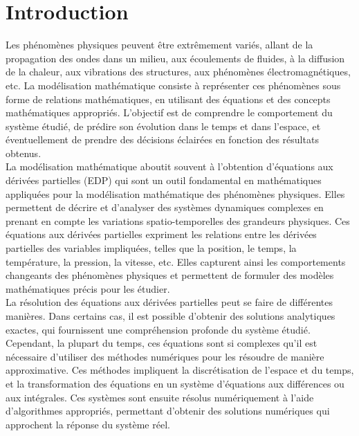 \chapter{Introduction}
\label{chap:introduction}

Les phénomènes physiques peuvent être extrêmement variés, allant de la propagation des ondes dans un milieu, aux écoulements de fluides, à la diffusion de la chaleur, aux vibrations des structures, aux phénomènes électromagnétiques, etc. La modélisation mathématique consiste à représenter ces phénomènes sous forme de relations mathématiques, en utilisant des équations et des concepts mathématiques appropriés. L'objectif est de comprendre le comportement du système étudié, de prédire son évolution dans le temps et dans l'espace, et éventuellement de prendre des décisions éclairées en fonction des résultats obtenus.\\

La modélisation mathématique aboutit souvent à l'obtention d'équations aux dérivées partielles (EDP) qui sont un outil fondamental en mathématiques appliquées pour la modélisation mathématique des phénomènes physiques. Elles permettent de décrire et d'analyser des systèmes dynamiques complexes en prenant en compte les variations spatio-temporelles des grandeurs physiques. Ces équations aux dérivées partielles expriment les relations entre les dérivées partielles des variables impliquées, telles que la position, le temps, la température, la pression, la vitesse, etc. Elles capturent ainsi les comportements changeants des phénomènes physiques et permettent de formuler des modèles mathématiques précis pour les étudier.\\

La résolution des équations aux dérivées partielles peut se faire de différentes manières. Dans certains cas, il est possible d'obtenir des solutions analytiques exactes, qui fournissent une compréhension profonde du système étudié. Cependant, la plupart du temps, ces équations sont si complexes qu'il est nécessaire d'utiliser des méthodes numériques pour les résoudre de manière approximative. Ces méthodes impliquent la discrétisation de l'espace et du temps, et la transformation des équations en un système d'équations aux différences ou aux intégrales. Ces systèmes sont ensuite résolus numériquement à l'aide d'algorithmes appropriés, permettant d'obtenir des solutions numériques qui approchent la réponse du système réel.


